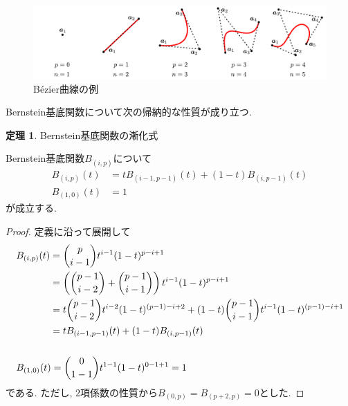 \documentclass{jsarticle}
\newcommand\Pare[1]{\left(#1\right)}
\newcommand\nCr[2]{\binom{#1}{#2}}
\theoremstyle{definition}%
\newtheorem{thm}{定理}
\begin{document}
\addtocounter{footnote}{-1}
\begin{figure}[H]
	\centering
    \includegraphics[page=1,clip,width=160mm]{fig.pdf}
	\caption{B\'ezier曲線の例\protect \footnotemark}
	\label{Fig101}
\end{figure}
Bernstein基底関数について次の帰納的な性質が成り立つ.
\begin{screen}
	\begin{thm}
		\label{Thm101}
		Bernstein基底関数の漸化式

        Bernstein基底関数$B_{(i,p)}$について
		\begin{align}
			B_{(i,p)}(t)&=tB_{(i-1,p-1)}(t)+(1-t)B_{(i,p-1)}(t) \\
    		B_{(1,0)}(t)&=1
		\end{align}
		が成立する.
	\end{thm}
\end{screen}
\begin{proof}
    定義に沿って展開して
    \begin{align}
        &\begin{aligned}
            B_{(i,p)}(t)
            &=\nCr{p}{i-1}t^{i-1}(1-t)^{p-i+1} \\
            &=\Pare{\nCr{p-1}{i-2}+\nCr{p-1}{i-1}}t^{i-1}(1-t)^{p-i+1} \\
            &=t\nCr{p-1}{i-2}t^{i-2}(1-t)^{(p-1)-i+2}+(1-t)\nCr{p-1}{i-1}t^{i-1}(1-t)^{(p-1)-i+1} \\
            &=tB_{(i-1,p-1)}(t)+(1-t)B_{(i,p-1)}(t)
        \end{aligned} \\ \notag \\
        &\begin{aligned}
            B_{(1,0)}(t)
            &=\nCr{0}{1-1}t^{1-1}(1-t)^{0-1+1}
            =1
        \end{aligned}
    \end{align}
    である.
    ただし, $2$項係数の性質から$B_{(0,p)}=B_{(p+2,p)}=0$とした.
\end{proof}
\end{document}
